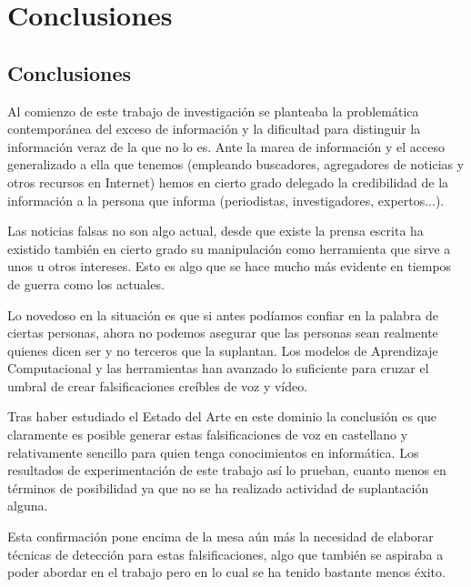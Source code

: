 \section{Conclusiones}

\subsection{Conclusiones}


Al comienzo de este trabajo de investigación se planteaba la problemática contemporánea del exceso de información y la dificultad para distinguir la información veraz de la que no lo es. Ante la marea de información y el acceso generalizado a ella que tenemos (empleando buscadores, agregadores de noticias y otros recursos en Internet) hemos en cierto grado delegado la credibilidad de la información a la persona que informa (periodistas, investigadores, expertos...).

Las noticias falsas no son algo actual, desde que existe la prensa escrita ha existido también en cierto grado su manipulación como herramienta que sirve a unos u otros intereses. Esto es algo que se hace mucho más evidente en tiempos de guerra como los actuales.

Lo novedoso en la situación es que si antes podíamos confiar en la palabra de ciertas personas, ahora no podemos asegurar que las personas sean realmente quienes dicen ser y no terceros que la suplantan. Los modelos de Aprendizaje Computacional y las herramientas han avanzado lo suficiente para cruzar el umbral de crear falsificaciones creíbles de voz y vídeo. 

Tras haber estudiado el Estado del Arte en este dominio la conclusión es que claramente es posible generar estas falsificaciones de voz en castellano y relativamente sencillo para quien tenga conocimientos en informática. Los resultados de experimentación de este trabajo así lo prueban, cuanto menos en términos de posibilidad ya que no se ha realizado actividad de suplantación alguna.

Esta confirmación pone encima de la mesa aún más la necesidad de elaborar técnicas de detección para estas falsificaciones, algo que también se aspiraba a poder abordar en el trabajo pero en lo cual se ha tenido bastante menos éxito. 

